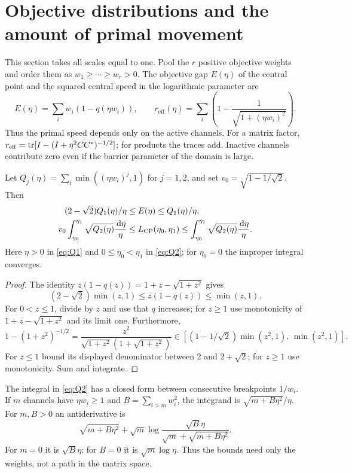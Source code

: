 \section{Objective distributions and the amount of primal movement}
\label{sec:distribution}
This section takes all scales equal to one. Pool the $r$ positive
objective weights and order them as $w_1\geq\cdots\geq w_r>0$. The
objective gap $E(\eta)$ of the central point and the squared central
speed in the logarithmic parameter are
\begin{equation}
 E(\eta)=\sum_iw_i(1-q(\eta w_i)),\qquad
 r_{\mathrm{eff}}(\eta)=\sum_i\left(1-\frac1{\sqrt{1+(\eta w_i)^2}}\right).
 \label{eq:effective-rank}
\end{equation}
Thus the primal speed depends only on the active channels.
For a matrix factor, $r_{\mathrm{eff}}=\operatorname{tr}[I-(I+\eta^2CC^*)^{-1/2}]$;
for products the traces add. Inactive channels contribute zero even
if the barrier parameter of the domain is large.

\begin{proposition}
\label{prop:distribution-law}
Let $Q_j(\eta)=\sum_i\min((\eta w_i)^j,1)$ for $j=1,2$, and set
$v_0=\sqrt{1-1/\sqrt2}$. Then
\begin{align}
 (2-\sqrt2)Q_1(\eta)/\eta&\leq E(\eta)\leq Q_1(\eta)/\eta,
 \label{eq:Q1}\\
 v_0\int_{\eta_0}^{\eta_1}\sqrt{Q_2(\eta)}\frac{\,\mathrm d\eta}{\eta}
 &\leq L_{\mathrm{CP}}(\eta_0,\eta_1)
 \leq\int_{\eta_0}^{\eta_1}\sqrt{Q_2(\eta)}\frac{\,\mathrm d\eta}{\eta}.
 \label{eq:Q2}
\end{align}
Here $\eta>0$ in \eqref{eq:Q1} and $0\leq\eta_0<\eta_1$ in
\eqref{eq:Q2}; for $\eta_0=0$ the improper integral converges.
\end{proposition}
\begin{proof}
The identity $z(1-q(z))=1+z-\sqrt{1+z^2}$ gives
\[
 (2-\sqrt2)\min(z,1)\leq z(1-q(z))\leq\min(z,1).
\]
For $0<z\leq1$, divide by $z$ and use that $q$ increases; for $z\geq1$
use monotonicity of $1+z-\sqrt{1+z^2}$ and its limit one.
Furthermore,
\[
 1-(1+z^2)^{-1/2}
 =\frac{z^2}{\sqrt{1+z^2}(1+\sqrt{1+z^2})}
 \in[(1-1/\sqrt2)\min(z^2,1),\,\min(z^2,1)].
\]
For $z\leq1$ bound its displayed denominator between $2$ and
$2+\sqrt2$; for $z\geq1$ use monotonicity. Sum and integrate.
\end{proof}
The integral in \eqref{eq:Q2} has a closed form between consecutive
breakpoints $1/w_i$. If $m$ channels have $\eta w_i\geq1$ and
$B=\sum_{i>m}w_i^2$, the integrand is $\sqrt{m+B\eta^2}/\eta$.
For $m,B>0$ an antiderivative is
\[
 \sqrt{m+B\eta^2}+\sqrt m\log
 \frac{\sqrt B\eta}{\sqrt m+\sqrt{m+B\eta^2}}.
\]
For $m=0$ it is $\sqrt B\eta$; for $B=0$ it is $\sqrt m\log\eta$.
Thus the bounds need only the weights, not a path in the matrix
space.

